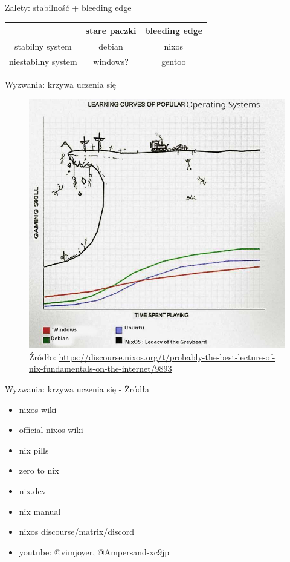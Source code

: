 \documentclass{beamer}
\begin{document}
\begin{frame}{Zalety: stabilność + bleeding edge}

\begin{table}[]
\begin{tabular}{c|c|c|}
\cline{2-3}
                                         & stare paczki & bleeding edge \\ \hline
\multicolumn{1}{|c|}{stabilny system}    & debian       & nixos         \\ \hline
\multicolumn{1}{|c|}{niestabilny system} & windows?     & gentoo        \\ \hline
\end{tabular}
\end{table}
\end{frame}
\begin{frame}{Wyzwania: krzywa uczenia się}
    \begin{figure}
        \includegraphics[width=0.75\linewidth, height=0.75\textheight]{./assets/nixoscurve.jpg}
        \caption*{\scriptsize Źródło: \url{https://discourse.nixos.org/t/probably-the-best-lecture-of-nix-fundamentals-on-the-internet/9893}} %
    \end{figure}
\end{frame}

\begin{frame}{Wyzwania: krzywa uczenia się - Źródła}
    \begin{itemize}
        \item nixos wiki
        \item official nixos wiki
        \item nix pills
        \item zero to nix
        \item nix.dev
        \item nix manual
        \item nixos discourse/matrix/discord
        \item youtube: @vimjoyer, @Ampersand-xc9jp
    \end{itemize}
\end{frame}
\end{document}
